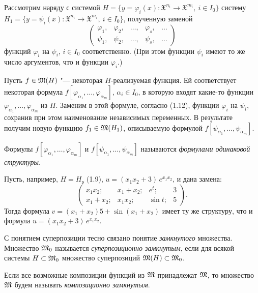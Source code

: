 Рассмотрим наряду с системой
$H=\{y=\varphi_i(x)\colon\mathfrak X^{n_i}\to\mathfrak X^{m_i},\ i\in I_0\}$
систему
$H_1=\{y=\psi_i(x)\colon\mathfrak X^{n_i}\to\mathfrak X^{m_i},\ i\in I_0\}$,
полученную заменой
\begin{equation}\tag{1.12}
\begin{pmatrix}\varphi_1,&\varphi_2,&\dots,&\varphi_s,&\dots\\ \psi_1,&\psi_2,&\dots,&\psi_s,&\dots\end{pmatrix}
\end{equation}
функций $\varphi_i$ на $\psi_i$, $i\in I_0$ соответственно. (При этом
функции $\psi_i$ имеют то же число аргументов, что и функции $\varphi_i$.)

Пусть $f\in\mathfrak M(H)$ "--- некоторая $H$-реализуемая функция. Ей соответствует
некоторая формула $f[\varphi_{\alpha_1},\dots,\varphi_{\alpha_m}]$,
$\alpha_i\in I_0$, в которую входят какие-то
функции $\varphi_{\alpha_1},\dots,\varphi_{\alpha_m}$ из $H$. Заменим в этой
формуле, согласно (1.12), функции $\varphi_i$ на $\psi_i$, сохранив при этом
наименование независимых переменных. В результате получим новую функцию
$f_1\in\mathfrak M(H_1)$, описываемую формулой
$f[\psi_{\alpha_1},\dots,\psi_{\alpha_m}]$.

Формулы $f[\varphi_{\alpha_1},\dots,\varphi_{\alpha_m}]$
и $f[\psi_{\alpha_1},\dots,\psi_{\alpha_m}]$ называются \emph{формулами
одинаковой структуры}.

Пусть, например, $H=H_{\text{э}}$ (1.9), $u=(x_1x_2+3)\,e^{x_1x_2}$, и дана
замена:
\[
\begin{pmatrix}x_1x_2;&x_1+x_2;&e^t;&3\\ x_1+x_2;&x_1x_2;&\sin t;&5\end{pmatrix}.
\]
Тогда формула $v=(x_1+x_2)5+\sin(x_1+x_2)$ имеет ту же структуру, что
и формула $u=(x_1x_2+3)\,e^{x_1x_2}$.

С понятием суперпозиции тесно связано понятие \emph{замкнутого}
множества. Множество $\mathfrak M_0$ называется \emph{суперпозиционно замкнутым},
если для всякой системы $H\subset\mathfrak M_0$ множество суперпозиций
$\mathfrak M(H)\subset\mathfrak M_0$.
%

Если все возможные композиции функций из $\mathfrak M$ принадлежат $\mathfrak M$, то
множество $\mathfrak M$ будем называть \emph{композиционно
замкнутым}.


